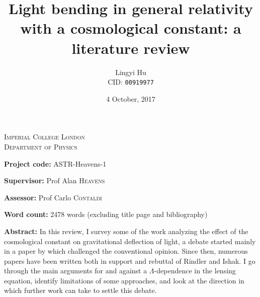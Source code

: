 



\begin{titlepage}
  \center

  \vspace*{2cm}
  \textsc{\Large Imperial College London}\\[0.5cm] 
  \textsc{\large Department of Physics}\\[0.5cm] 

  \title{\bf{Light bending in general relativity with a cosmological constant: a literature review}}
  \date{4 October, 2017}
  \author{Lingyi Hu\\ CID: \texttt{00919977}}

  {\let\newpage\relax\maketitle}
  \thispagestyle{empty}

  \vspace*{1cm}
  \noindent
  \large
  {\bf Project code:} ASTR-Heavens-1\par
  {\bf Supervisor:} Prof Alan \textsc{Heavens}\par
  {\bf Assessor:} Prof Carlo \textsc{Contaldi}

  \vspace*{1cm}

  {\bf Word count:}
  2478 words (excluding title page and bibliography)

  \vspace*{2cm}


\end{titlepage}


\vspace*{2cm}
\noindent
{\bf Abstract:} In this review, I survey some of the work analyzing the effect of the cosmological constant on gravitational deflection of light, a debate started mainly in a paper by \citet{Rindler2007} which challenged the conventional opinion. Since then, numerous papers have been written both in support and rebuttal of Rindler and Ishak. I go through the main arguments for and against a $\Lambda$-dependence in the lensing equation, identify limitations of some approaches, and look at the direction in which further work can take to settle this debate. 










\newpage
\noindent
\vspace*{2cm}

\printbibliography[heading=bibintoc]


